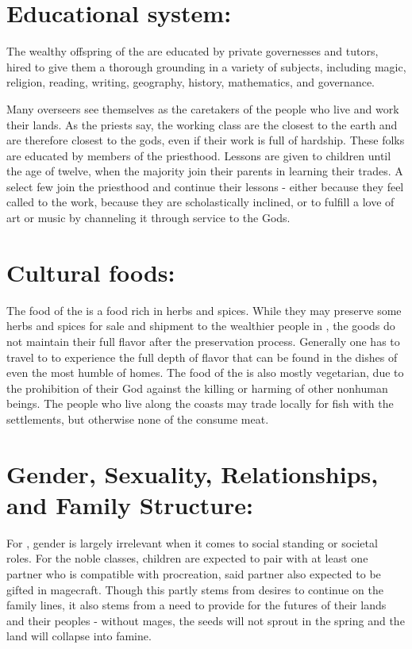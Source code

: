\documentclass[blue]{GL2020}
\begin{document}
\section*{Educational system:}

The wealthy offspring of the \pSunCh{} are educated by private governesses and tutors, hired to give them a thorough grounding in a variety of subjects, including magic, religion, reading, writing, geography, history, mathematics, and governance.

Many overseers see themselves as the caretakers of the people who live and work their lands.  As the priests say, the working class are the closest to the earth and are therefore closest to the gods, even if their work is full of hardship.  These folks are educated by members of the priesthood.  Lessons are given to children until the age of twelve, when the majority join their parents in learning their trades.  A select few join the priesthood and continue their lessons - either because they feel called to the work, because they are scholastically inclined, or to fulfill a love of art or music by channeling it through service to the Gods.

\section*{Cultural foods:}

The food of the \pSunCh{} is a food rich in herbs and spices.  While they may preserve some herbs and spices for sale and shipment to the wealthier people in \pCreators{}, the goods do not maintain their full flavor after the preservation process.  Generally one has to travel to \pSun{} to experience the full depth of flavor that can be found in the dishes of even the most humble of homes.  The food of the \pSunCh{} is also mostly vegetarian, due to the prohibition of their God against the killing or harming of other nonhuman beings.  The people who live along the coasts may trade locally for fish with the \pVikings{} settlements, but otherwise none of the \pSunCh{} consume meat.

\section*{Gender, Sexuality, Relationships, and Family Structure:}

For \pSunCh{}, gender is largely irrelevant when it comes to social standing or societal roles.  For the noble classes, children are expected to pair with at least one partner who is compatible with procreation, said partner also expected to be gifted in magecraft.  Though this partly stems from desires to continue on the family lines, it also stems from a need to provide for the futures of their lands and their peoples - without mages, the seeds will not sprout in the spring and the land will collapse into famine.  
\end{document}

